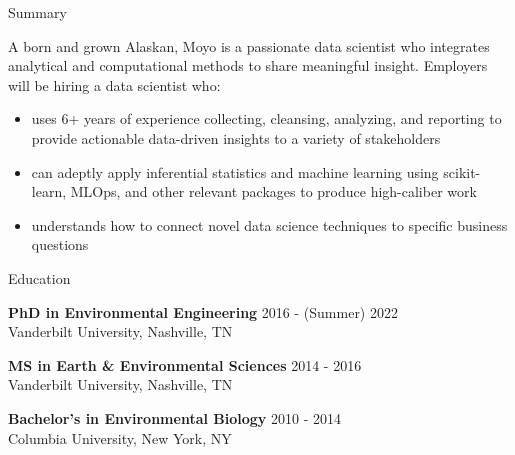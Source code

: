 \documentclass{resume} %
\begin{document}

\begin{rSection}{Summary}

A born and grown Alaskan, Moyo is a passionate data scientist who integrates analytical and computational methods to share meaningful insight. Employers will be hiring a data scientist who:
{\begin{itemize}
    \item {uses 6+ years of experience collecting, cleansing, analyzing, and reporting to provide actionable data-driven insights to a variety of stakeholders}
    \item {can adeptly apply inferential statistics and machine learning using scikit-learn, MLOps, and other relevant packages to produce high-caliber work}
    \item {understands how to connect novel data science techniques to specific business questions}
\end{itemize} }

\end{rSection}


\begin{rSection}{Education}

{\bf PhD in Environmental Engineering} \hfill {2016 - (Summer) 2022}
\\ 
Vanderbilt University, Nashville, TN 

{\bf MS in Earth \& Environmental Sciences}  \hfill {2014 - 2016}
\\
Vanderbilt University, Nashville, TN
 
{\bf Bachelor's in Environmental Biology}  \hfill {2010 - 2014}
\\
Columbia University, New York, NY

\end{rSection}
\end{document}
